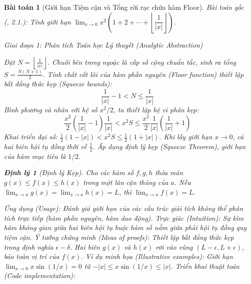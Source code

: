 \documentclass{article}
\newtheorem{baitoan}{Bài toán}
\newtheorem{dinhly}{Định lý}
\begin{document}

\begin{baitoan}[Giới hạn Tiệm cận và Tổng rời rạc chứa hàm Floor]
 \emph{Bài toán gốc (\cite{Quoc_Long_Dat_Nam_VMC}, 2.1.):} 
 Tính giới hạn $\lim_{x\to0} x^2\left(1 + 2 + \cdots + \left\lfloor\dfrac{1}{|x|}\right\rfloor\right)$.

\vspace{0.5em}\noindent\emph{Giai đoạn 1: Phân tích Toán học Lý thuyết (Analytic Abstraction)}
 
 Đặt $N = \left\lfloor \frac{1}{|x|} \right\rfloor$. Chuỗi bên trong ngoặc là cấp số cộng chuẩn tắc, sinh ra tổng $S = \frac{N(N+1)}{2}$. 
 Tính chất cốt lõi của hàm phần nguyên (Floor function) thiết lập bất đẳng thức kẹp (Squeeze bounds):
 \begin{equation}
 \frac{1}{|x|} - 1 < N \le \frac{1}{|x|}
 \end{equation}
 Bình phương và nhân với hệ số $x^2/2$, ta thiết lập hệ vi phân kẹp:
 \begin{equation}
 \frac{x^2}{2} \left( \frac{1}{|x|} - 1 \right) \frac{1}{|x|} < x^2 S \le \frac{x^2}{2} \frac{1}{|x|} \left( \frac{1}{|x|} + 1 \right)
 \end{equation}
 Khai triển đại số: $\frac{1}{2} (1 - |x|) < x^2 S \le \frac{1}{2} (1 + |x|)$.
 Khi lấy giới hạn $x \to 0$, cả hai biên hội tụ đồng thời về $\frac{1}{2}$. Áp dụng định lý kẹp (Squeeze Theorem), giới hạn của hàm mục tiêu là $1/2$.

\begin{dinhly}[Định lý Kẹp]
Cho các hàm số $f, g, h$ thỏa mãn $g(x) \le f(x) \le h(x)$ trong một lân cận thủng của $a$. Nếu $\lim_{x \to a} g(x) = \lim_{x \to a} h(x) = L$, thì $\lim_{x \to a} f(x) = L$.
\end{dinhly}
\emph{Ứng dụng (Usage):} Đánh giá giới hạn của các cấu trúc giải tích không thể phân tích trực tiếp (hàm phần nguyên, hàm dao động).
\emph{Trực giác (Intuition):} Sự kìm hãm không gian giữa hai biên hội tụ buộc hàm số nằm giữa phải hội tụ đồng quy tiệm cận.
\emph{Ý tưởng chứng minh (Ideas of proofs):} Thiết lập bất đẳng thức kẹp trong định nghĩa $\epsilon-\delta$. Hai biên $g(x)$ và $h(x)$ rơi vào vùng $(L-\epsilon, L+\epsilon)$, bảo toàn vị trí của $f(x)$.
\emph{Ví dụ minh họa (Illustrative examples):} Giới hạn $\lim_{x \to 0} x \sin(1/x) = 0$ từ $-|x| \le x \sin(1/x) \le |x|$.
\emph{Triển khai thuật toán (Code implementation):}




\end{baitoan}
\end{document}
